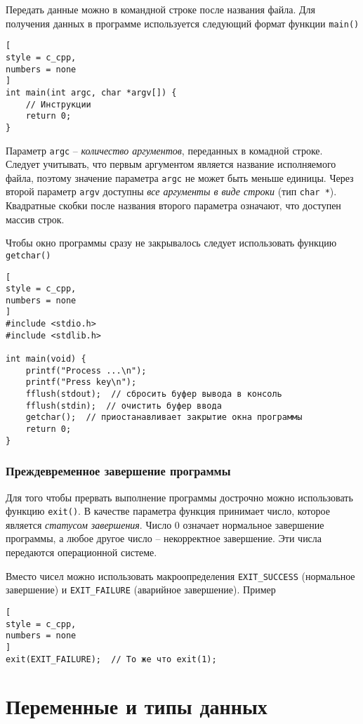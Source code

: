 \documentclass[%
	11pt,
	a4paper,
	utf8,
		]{article}
\begin{document}
Передать данные можно в командной строке после названия файла. Для получения данных в программе используется следующий формат функции \verb|main()|
\begin{lstlisting}[
style = c_cpp,
numbers = none
]
int main(int argc, char *argv[]) {
    // Инструкции
    return 0;
}
\end{lstlisting}

Параметр \verb|argc| -- \emph{количество аргументов}, переданных в комадной строке. Следует учитывать, что первым аргументом является название исполняемого файла, поэтому значение параметра \verb*|argc| не может быть меньше единицы. Через второй параметр \verb*|argv| доступны \emph{все аргументы в виде строки} (тип \verb|char *|). Квадратные скобки после названия второго параметра означают, что доступен массив строк.

Чтобы окно программы сразу не закрывалось следует использовать функцию \verb|getchar()|
\begin{lstlisting}[
style = c_cpp,
numbers = none
]
#include <stdio.h>
#include <stdlib.h>

int main(void) {
    printf("Process ...\n");
    printf("Press key\n");
    fflush(stdout);  // сбросить буфер вывода в консоль
    fflush(stdin);  // очистить буфер ввода
    getchar();  // приостанавливает закрытие окна программы
    return 0;
}
\end{lstlisting}

\subsubsection{Преждевременное завершение программы}

Для того чтобы прервать выполнение программы дострочно можно использовать функцию \verb*|exit()|. В качестве параметра функция принимает число, которое является \emph{статусом завершения}. Число 0 означает нормальное завершение программы, а любое другое число -- некорректное завершение. Эти числа передаются операционной системе.

Вместо чисел можно использовать макроопределения \verb|EXIT_SUCCESS| (нормальное завершение) и \verb*|EXIT_FAILURE| (аварийное завершение). Пример
\begin{lstlisting}[
style = c_cpp,
numbers = none
]
exit(EXIT_FAILURE);  // То же что exit(1);
\end{lstlisting}



\section{Переменные и типы данных}
\end{document}
